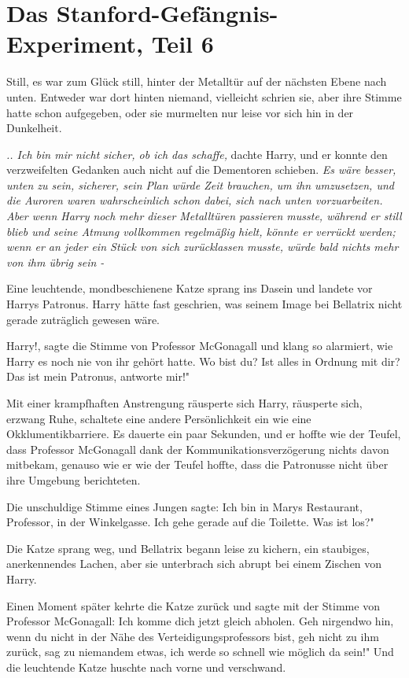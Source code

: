 \chapter{Das Stanford-Gefängnis-Experiment, Teil 6}

Still, es war zum Glück still, hinter der Metalltür auf der nächsten Ebene nach
unten. Entweder war dort hinten niemand, vielleicht schrien sie, aber ihre
Stimme hatte schon aufgegeben, oder sie murmelten nur leise vor sich hin in der
Dunkelheit.

\emph{.. Ich bin mir nicht sicher, ob ich das schaffe,} dachte Harry, und er
konnte den verzweifelten Gedanken auch nicht auf die Dementoren schieben.
\emph{Es wäre besser, unten zu sein, sicherer, sein Plan würde Zeit brauchen, um
ihn umzusetzen, und die Auroren waren wahrscheinlich schon dabei, sich nach
unten vorzuarbeiten. Aber wenn Harry noch mehr dieser Metalltüren passieren
musste, während er still blieb und seine Atmung vollkommen regelmäßig hielt,
könnte er verrückt werden; wenn er an jeder ein Stück von sich zurücklassen
musste, würde bald nichts mehr von ihm übrig sein -}

Eine leuchtende, mondbeschienene Katze sprang ins Dasein und landete vor Harrys
Patronus. Harry hätte fast geschrien, was seinem Image bei Bellatrix nicht
gerade zuträglich gewesen wäre.

\glqq{}Harry!\grqq{}, sagte die Stimme von Professor McGonagall und klang so
alarmiert, wie Harry es noch nie von ihr gehört hatte. \glqq{}Wo bist du? Ist
alles in Ordnung mit dir? Das ist mein Patronus, antworte mir!"

Mit einer krampfhaften Anstrengung räusperte sich Harry, räusperte sich, erzwang
Ruhe, schaltete eine andere Persönlichkeit ein wie eine Okklumentikbarriere. Es
dauerte ein paar Sekunden, und er hoffte wie der Teufel, dass Professor
McGonagall dank der Kommunikationsverzögerung nichts davon mitbekam, genauso wie
er wie der Teufel hoffte, dass die Patronusse nicht über ihre Umgebung
berichteten.

Die unschuldige Stimme eines Jungen sagte: \glqq{}Ich bin in Marys Restaurant,
Professor, in der Winkelgasse. Ich gehe gerade auf die Toilette. Was ist los?"

Die Katze sprang weg, und Bellatrix begann leise zu kichern, ein staubiges,
anerkennendes Lachen, aber sie unterbrach sich abrupt bei einem Zischen von
Harry.

Einen Moment später kehrte die Katze zurück und sagte mit der Stimme von
Professor McGonagall: \glqq{}Ich komme dich jetzt gleich abholen. Geh nirgendwo
hin, wenn du nicht in der Nähe des Verteidigungsprofessors bist, geh nicht zu
ihm zurück, sag zu niemandem etwas, ich werde so schnell wie möglich da sein!"
Und die leuchtende Katze huschte nach vorne und verschwand.

